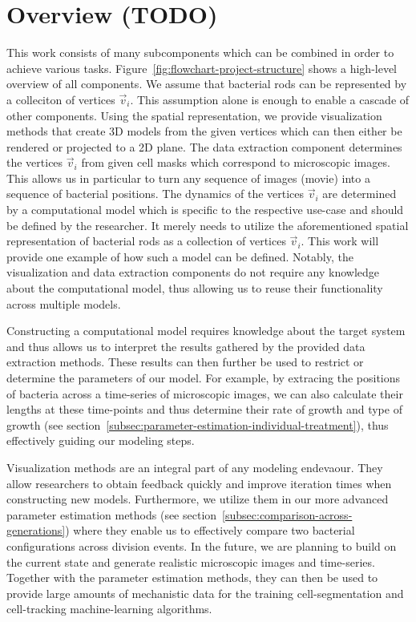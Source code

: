 \documentclass{article}
\begin{document}
\section{Overview (TODO)}
This work consists of many subcomponents which can be combined in order to achieve various tasks.
Figure~\ref{fig:flowchart-project-structure} shows a high-level overview of all components.
We assume that bacterial rods can be represented by a colleciton of vertices $\vec{v}_i$.
This assumption alone is enough to enable a cascade of other components.
Using the spatial representation, we provide visualization methods that create 3D models from the
given vertices which can then either be rendered or projected to a 2D plane.
The data extraction component determines the vertices $\vec{v}_i$ from given cell masks which
correspond to microscopic images.
This allows us in particular to turn any sequence of images (movie) into a sequence of bacterial
positions.
The dynamics of the vertices $\vec{v}_i$ are determined by a computational model which is specific
to the respective use-case and should be defined by the researcher.
It merely needs to utilize the aforementioned spatial representation of bacterial rods as a
collection of vertices $\vec{v}_i$.
This work will provide one example of how such a model can be defined.
Notably, the visualization and data extraction components do not require any knowledge about the
computational model, thus allowing us to reuse their functionality across multiple models.

Constructing a computational model requires knowledge about the target system and thus allows us to
interpret the results gathered by the provided data extraction methods.
These results can then further be used to restrict or determine the parameters of our model.
For example, by extracing the positions of bacteria across a time-series of microscopic images, we
can also calculate their lengths at these time-points and thus determine their rate of growth and
type of growth (see section~\ref{subsec:parameter-estimation-individual-treatment}), thus
effectively guiding our modeling steps.

Visualization methods are an integral part of any modeling endevaour.
They allow researchers to obtain feedback quickly and improve iteration times when constructing new
models.
Furthermore, we utilize them in our more advanced parameter estimation methods (see
section~\ref{subsec:comparison-across-generations}) where they enable us to effectively compare
two bacterial configurations across division events.
In the future, we are planning to build on the current state and generate realistic microscopic
images and time-series.
Together with the parameter estimation methods, they can then be used to provide large amounts of
mechanistic data for the training cell-segmentation and cell-tracking machine-learning algorithms.
\end{document}
